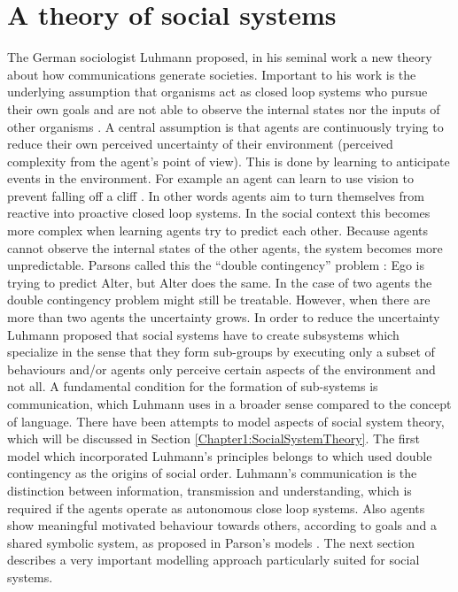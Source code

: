
\section{A theory of social systems}
The German sociologist Luhmann proposed, in his seminal work \citep{Luhmann94} a
new theory about how communications generate societies. Important to his
work is the underlying assumption that organisms act as closed loop systems
\citep{Wiener61,Glasersfeld1995} who pursue their own goals and are not able to observe
the internal states nor the inputs of other organisms \citep{vonFoerster60}.
A central assumption is that agents are continuously trying to reduce their own
perceived uncertainty of their environment (perceived complexity from the
agent's point of view). This is done by learning to anticipate events in the
environment. For example an agent can learn to use vision to prevent falling off
a cliff \citep{Verschure91}. In other words agents aim to turn
themselves from reactive into proactive closed loop systems.
In the social context this becomes more complex when learning agents try to
predict each other. Because agents cannot observe the internal states of the
other agents, the system becomes more unpredictable. Parsons called this the
“double contingency” problem \citep{Parsons77}:
Ego is trying to predict Alter, but Alter does the same.
In the case of two agents the double contingency problem might still
be treatable. However, when there are more than two agents the uncertainty
grows.
In order to reduce the uncertainty Luhmann proposed that social systems
have to create subsystems which specialize \citep{Luhmann94} in the sense that
they form sub-groups by executing only a subset of behaviours and/or agents
only perceive certain aspects of the environment and not all.
A fundamental condition for the formation of sub-systems is communication, 
which Luhmann uses in a broader sense compared to the concept of language.
There have been attempts to model aspects of social system theory, which 
will be discussed in Section \ref{Chapter1:SocialSystemTheory}.
The first model which incorporated Luhmann's principles belongs to 
\citet{SocialOrderScalability} which used 
double contingency as the origins of social order. 
Luhmann's communication is the distinction between information, transmission
and understanding, which is required if the agents operate as autonomous close
loop systems. Also agents show meaningful motivated behaviour towards
others, according to goals and a shared symbolic system, as proposed in Parson's
models \citep{Parsons51,Parsons77}.
The next section describes a very important modelling approach particularly suited
for social systems.

